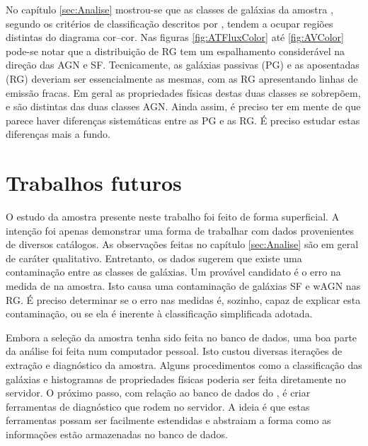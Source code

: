 No capítulo \ref{sec:Analise} mostrou-se que as classes de galáxias da amostra
\starlightUV, segundo os critérios de classificação descritos por
\citet{CidFernandes2011}, tendem a ocupar regiões distintas do diagrama
cor--cor. Nas figuras \ref{fig:ATFluxColor} até \ref{fig:AVColor} pode-se notar
que a distribuição de RG tem um espalhamento considerável na direção das AGN e
SF. Tecnicamente, as galáxias passivas (PG) e as aposentadas (RG) deveriam ser
essencialmente as mesmas, com as RG apresentando linhas de emissão fracas. Em
geral as propriedades físicas destas duas classes se sobrepõem, e são distintas
das duas classes AGN. Ainda assim, é preciso ter em mente de que parece haver
diferenças sistemáticas entre as PG e as RG. É preciso estudar estas diferenças
mais a fundo.



\section{Trabalhos futuros}

O estudo da amostra \starlightUV presente neste trabalho foi feito de forma
superficial. A intenção foi apenas demonstrar uma forma de trabalhar com dados
provenientes de diversos catálogos. As observações feitas no capítulo
\ref{sec:Analise} são em geral de caráter qualitativo. Entretanto, os dados
sugerem que existe uma contaminação entre as classes de galáxias. Um provável
candidato é o erro na medida de \WHa na amostra. Isto causa uma contaminação de
galáxias SF e wAGN nas RG. É preciso determinar se o erro nas medidas é,
sozinho, capaz de explicar esta contaminação, ou se ela é inerente à
classificação simplificada adotada.

Embora a seleção da amostra tenha sido feita no banco de dados, uma boa parte da
análise foi feita num computador pessoal. Isto custou diversas iterações de
extração e diagnóstico da amostra. Alguns procedimentos como a classificação das
galáxias e histogramas de propriedades físicas poderia ser feita diretamente no
servidor. O próximo passo, com relação ao banco de dados do \starlight, é criar
ferramentas de diagnóstico que rodem no servidor. A ideia é que estas
ferramentas possam ser facilmente estendidas e abstraiam a forma como as
informações estão armazenadas no banco de dados.

